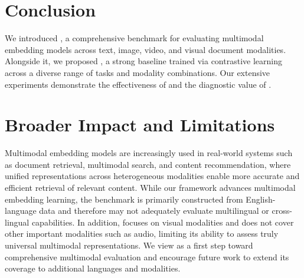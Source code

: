 \section{Conclusion}

We introduced \benchmark, a comprehensive benchmark for evaluating multimodal embedding models across text, image, video, and visual document modalities. Alongside it, we proposed \model, a strong baseline trained via contrastive learning across a diverse range of tasks and modality combinations. Our extensive experiments demonstrate the effectiveness of \model and the diagnostic value of \benchmark.


\section{Broader Impact and Limitations} 
Multimodal embedding models are increasingly used in real-world systems such as document retrieval, multimodal search, and content recommendation, where unified representations across heterogeneous modalities enable more accurate and efficient retrieval of relevant content. While our framework advances multimodal embedding learning, the \benchmark benchmark is primarily constructed from English-language data and therefore may not adequately evaluate multilingual or cross-lingual capabilities. In addition, \benchmark focuses on visual modalities and does not cover other important modalities such as audio, limiting its ability to assess truly universal multimodal representations. We view \benchmark as a first step toward comprehensive multimodal evaluation and encourage future work to extend its coverage to additional languages and modalities.
